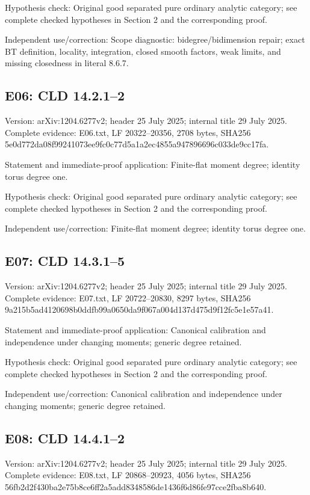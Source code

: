 \documentclass[11pt]{article}
\begin{document}
Hypothesis check: Original good separated pure ordinary analytic category; see complete checked hypotheses in Section 2 and the corresponding proof.

Independent use/correction: Scope diagnostic: bidegree/bidimension repair; exact BT definition, locality, integration, closed smooth factors, weak limits, and missing closedness in literal 8.6.7.

\subsection{E06: CLD 14.2.1--2}

Version: arXiv:1204.6277v2; header 25 July 2025; internal title 29 July 2025. Complete evidence: E06.txt, LF 20322--20356, 2708 bytes, SHA256 5e0d772da08f99241073ee9fc0c77d5a1a2ec4855a947896696c033de9cc17fa.

Statement and immediate-proof application: Finite-flat moment degree; identity torus degree one.

Hypothesis check: Original good separated pure ordinary analytic category; see complete checked hypotheses in Section 2 and the corresponding proof.

Independent use/correction: Finite-flat moment degree; identity torus degree one.

\subsection{E07: CLD 14.3.1--5}

Version: arXiv:1204.6277v2; header 25 July 2025; internal title 29 July 2025. Complete evidence: E07.txt, LF 20722--20830, 8297 bytes, SHA256 9a215b5ad4120698b0ddfb99a0650da9f067a004d137d475d9f12fc5e1e57a41.

Statement and immediate-proof application: Canonical calibration and independence under changing moments; generic degree retained.

Hypothesis check: Original good separated pure ordinary analytic category; see complete checked hypotheses in Section 2 and the corresponding proof.

Independent use/correction: Canonical calibration and independence under changing moments; generic degree retained.

\subsection{E08: CLD 14.4.1--2}

Version: arXiv:1204.6277v2; header 25 July 2025; internal title 29 July 2025. Complete evidence: E08.txt, LF 20868--20923, 4056 bytes, SHA256 56fb2d2f430ba2e75b8ce6ff2a5add8348586de1436f6d86fe97cce2fba8b640.
\end{document}
